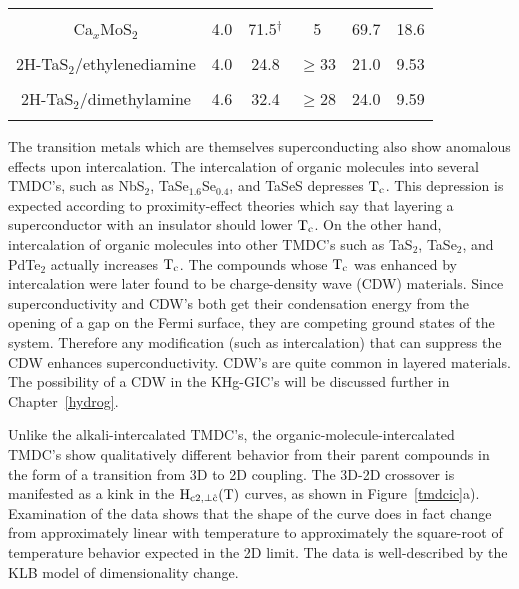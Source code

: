 \begin{table}
\begin{center}
\begin{tabular}{|c|ccccc|}
& & & & & \\
Ca$ _x$MoS$_2$\cite{woollam76,somoano75} & 4.0 & 71.5$^{\dagger}$ & 5 & 69.7 & 18.6 \\
& & & & & \\
2H-TaS$_2$/ethylenediamine\cite{coleman83} & 4.0 & 24.8 & $\geq$33 & 21.0 & 9.53 \\
& & & & & \\
2H-TaS$_2$/dimethylamine\cite{coleman83}& 4.6 & 32.4 & $\geq$28 & 24.0 & 9.59 \\
& & & & & \\
\hline
\end{tabular}
\end{center}
\end{table}


        The tran\-si\-tion  metals which   are them\-selves su\-per\-con\-duct\-ing  also
show anom\-a\-lous  effects upon in\-ter\-cal\-ation.  The  in\-ter\-cal\-ation  of organic
molecules   into    several     TMDC's,  such  as   NbS$_2$,\cite{gamble70}
TaSe$_{1.6}$Se$_{0.4}$,\cite{prober80} and TaSeS\cite{morris73}   depresses
$\rm T_c$.  This  depression  is  expected  according  to  proximity-effect
theories\cite{degennes66,cooper61} which say that layering a superconductor
with an insulator should lower $\rm T_c$.  On the other hand, in\-ter\-cal\-ation
of organic  molecules  into other TMDC's  such  as TaS$_2$,  TaSe$_2$,  and
PdTe$_2$  actually increases $\rm  T_c$.\cite{gamble70} The compounds whose
$\rm  T_c$   was   enhanced by  in\-ter\-cal\-ation   were  later found   to   be
charge-density  wave  (CDW)   materials.\cite{wilson74,dalrymple83}   Since
superconductivity  and CDW's both   get their condensation  energy from the
opening of a gap on the Fermi surface, they  are competing ground states of
the system.  Therefore  any modification (such  as  in\-ter\-cal\-ation) that can
suppress the  CDW enhances superconductivity.  CDW's   are quite common  in
layered   materials.\cite{friend79} The    possibility  of a  CDW  in   the
KHg-GIC's\cite{delong83} will be discussed further in Chapter~\ref{hydrog}.

        Unlike         the        alkali-intercalated      TMDC's,      the
organic-molecule-intercalated TMDC's show qualitatively different  behavior
from their parent  compounds in the  form of a   transition from 3D   to 2D
coupling.\cite{coleman83,prober80} The  3D-2D  crossover is manifested as a
kink  in  the  $\rm   H_{c2,  \perp  \hat{c}}(T)$    curves,  as  shown  in
Figure~\ref{tmdcic}a).  
Examination of the  data shows  that  the shape  of the curve  does in fact
change  from approximately  linear with  temperature to  approximately  the
square-root of temperature behavior expected in the 2D  limit.  The data is
well-described by the KLB model of dimensionality change.\cite{klemm75}

